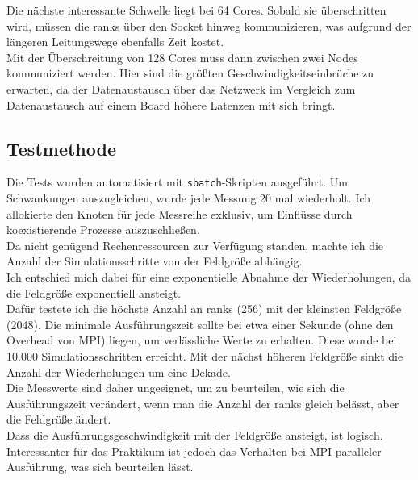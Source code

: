 \documentclass[german,plainarticle,hyperref,utf8]{zihpub}
\begin{document}
	Die nächste interessante Schwelle liegt bei 64 Cores. Sobald sie überschritten wird, müssen die ranks über den Socket hinweg kommunizieren, was aufgrund der längeren Leitungswege ebenfalls Zeit kostet.\\
	
	Mit der Überschreitung von 128 Cores muss dann zwischen zwei Nodes kommuniziert werden. Hier sind die größten Geschwindigkeitseinbrüche zu erwarten, da der Datenaustausch über das Netzwerk im Vergleich zum Datenaustausch auf einem Board höhere Latenzen mit sich bringt.
	\subsection{Testmethode}
	Die Tests wurden automatisiert mit \texttt{sbatch}-Skripten ausgeführt. Um Schwankungen auszugleichen, wurde jede Messung 20 mal wiederholt. Ich allokierte den Knoten für jede Messreihe exklusiv, um Einflüsse durch koexistierende Prozesse auszuschließen.\\
	Da nicht genügend Rechenressourcen zur Verfügung standen, machte ich die Anzahl der Simulationsschritte von der Feldgröße abhängig.\\
	Ich entschied mich dabei für eine exponentielle Abnahme der Wiederholungen, da die Feldgröße exponentiell ansteigt.\\
	
	Dafür testete ich die höchste Anzahl an ranks (256) mit der kleinsten Feldgröße (2048). Die minimale Ausführungszeit sollte bei etwa einer Sekunde (ohne den Overhead von MPI) liegen, um verlässliche Werte zu erhalten. Diese wurde bei 10.000 Simulationsschritten erreicht. Mit der nächst höheren Feldgröße sinkt die Anzahl der Wiederholungen um eine Dekade.\\
	
	Die Messwerte sind daher ungeeignet, um zu beurteilen, wie sich die Ausführungszeit verändert, wenn man die Anzahl der ranks gleich belässt, aber die Feldgröße ändert.\\
	Dass die Ausführungsgeschwindigkeit mit der Feldgröße ansteigt, ist logisch. Interessanter für das Praktikum ist jedoch das Verhalten bei MPI-paralleler Ausführung, was sich beurteilen lässt.\\
	
\end{document}

